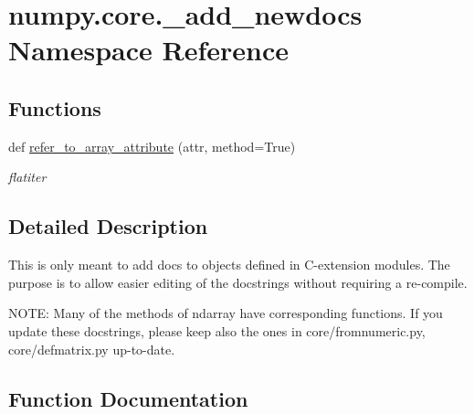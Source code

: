 \hypertarget{namespacenumpy_1_1core_1_1__add__newdocs}{}\section{numpy.\+core.\+\_\+add\+\_\+newdocs Namespace Reference}
\label{namespacenumpy_1_1core_1_1__add__newdocs}
\subsection*{Functions}
\begin{DoxyCompactItemize}
\item 
def \hyperlink{namespacenumpy_1_1core_1_1__add__newdocs_aaf5aae2feca5a19cc863d2f180109b76}{refer\+\_\+to\+\_\+array\+\_\+attribute} (attr, method=True)
\begin{DoxyCompactList}\small\item\em flatiter \end{DoxyCompactList}\end{DoxyCompactItemize}


\subsection{Detailed Description}
\begin{DoxyVerb}This is only meant to add docs to objects defined in C-extension modules.
The purpose is to allow easier editing of the docstrings without
requiring a re-compile.

NOTE: Many of the methods of ndarray have corresponding functions.
  If you update these docstrings, please keep also the ones in
  core/fromnumeric.py, core/defmatrix.py up-to-date.\end{DoxyVerb}
 

\subsection{Function Documentation}
\mbox{\label{namespacenumpy_1_1core_1_1__add__newdocs_aaf5aae2feca5a19cc863d2f180109b76}} 
